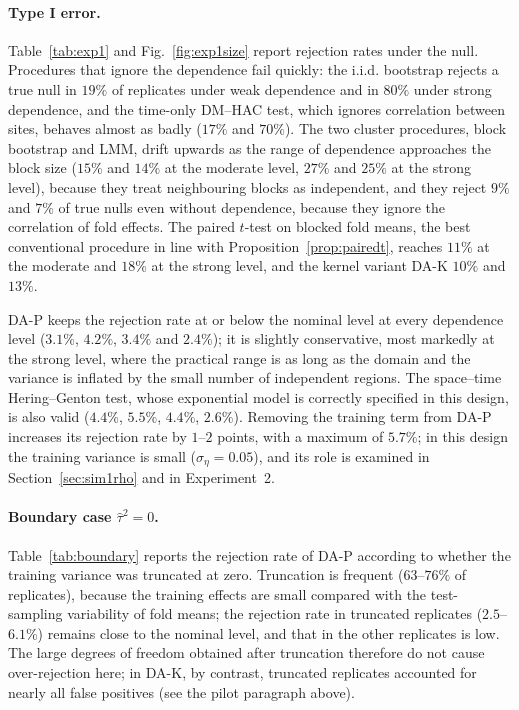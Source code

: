 \paragraph{Type I error.} Table~\ref{tab:exp1} and Fig.~\ref{fig:exp1size} report rejection rates under the null. Procedures that ignore the dependence fail quickly: the i.i.d. bootstrap rejects a true null in $19\%$ of replicates under weak dependence and in $80\%$ under strong dependence, and the time-only DM--HAC test, which ignores correlation between sites, behaves almost as badly ($17\%$ and $70\%$). The two cluster procedures, block bootstrap and LMM, drift upwards as the range of dependence approaches the block size ($15\%$ and $14\%$ at the moderate level, $27\%$ and $25\%$ at the strong level), because they treat neighbouring blocks as independent, and they reject $9\%$ and $7\%$ of true nulls even without dependence, because they ignore the correlation of fold effects. The paired $t$-test on blocked fold means, the best conventional procedure in line with Proposition~\ref{prop:pairedt}, reaches $11\%$ at the moderate and $18\%$ at the strong level, and the kernel variant DA-K $10\%$ and $13\%$.

DA-P keeps the rejection rate at or below the nominal level at every dependence level ($3.1\%$, $4.2\%$, $3.4\%$ and $2.4\%$); it is slightly conservative, most markedly at the strong level, where the practical range is as long as the domain and the variance is inflated by the small number of independent regions. The space--time Hering--Genton test, whose exponential model is correctly specified in this design, is also valid ($4.4\%$, $5.5\%$, $4.4\%$, $2.6\%$). Removing the training term from DA-P increases its rejection rate by $1$--$2$ points, with a maximum of $5.7\%$; in this design the training variance is small ($\sigma_\eta=0.05$), and its role is examined in Section~\ref{sec:sim1rho} and in Experiment~2.

\paragraph{Boundary case $\hat\tau^2=0$.} Table~\ref{tab:boundary} reports the rejection rate of DA-P according to whether the training variance was truncated at zero. Truncation is frequent ($63$--$76\%$ of replicates), because the training effects are small compared with the test-sampling variability of fold means; the rejection rate in truncated replicates ($2.5$--$6.1\%$) remains close to the nominal level, and that in the other replicates is low. The large degrees of freedom obtained after truncation therefore do not cause over-rejection here; in DA-K, by contrast, truncated replicates accounted for nearly all false positives (see the pilot paragraph above).

